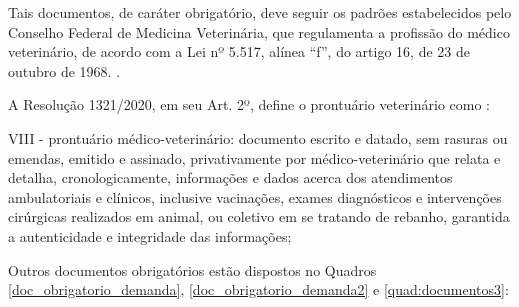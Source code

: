 \documentclass[
    12pt,               %
    openright,          %
    oneside,
    a4paper,            %
    BIBLATEX,           %
    TODO,               %
    english,            %
    brazil              %
    ]{ifsp-spo-inf-ctds}
\begin{document}
        Tais documentos, de caráter obrigatório, deve seguir os padrões estabelecidos pelo Conselho Federal de Medicina Veterinária, que regulamenta a profissão do médico veterinário, de acordo com a Lei nº 5.517, alínea “f”, do artigo 16, de 23 de outubro de 1968. .

        A Resolução 1321/2020, em seu Art. 2º, define o prontuário veterinário como : 

        \begin{citacao}

        
            VIII - prontuário médico-veterinário: documento escrito e datado, sem rasuras ou emendas, emitido e assinado, privativamente por médico-veterinário que relata e detalha, cronologicamente, informações e dados acerca dos atendimentos ambulatoriais e clínicos, inclusive vacinações, exames diagnósticos e intervenções cirúrgicas realizados em animal, ou coletivo em se tratando de rebanho, garantida a autenticidade e integridade das informações;
        \end{citacao}

        Outros documentos obrigatórios estão dispostos no Quadros \ref{doc_obrigatorio_demanda}, \ref{doc_obrigatorio_demanda2} e \ref{quad:documentos3}: 
\end{document}
